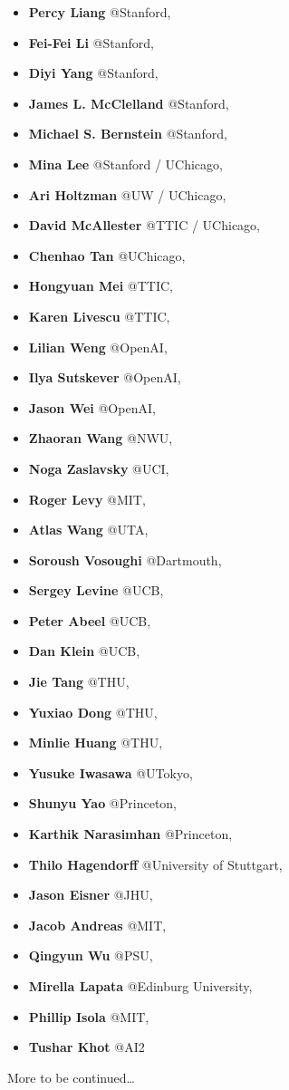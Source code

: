 \documentclass[10pt]{article} %
\begin{document}
\begin{itemize}
\item \textbf{Percy Liang} @Stanford,
\item \textbf{Fei-Fei Li} @Stanford,
\item \textbf{Diyi Yang} @Stanford, 
\item \textbf{James L. McClelland} @Stanford,
\item \textbf{Michael S. Bernstein} @Stanford,
\item \textbf{Mina Lee} @Stanford / UChicago,
\item \textbf{Ari Holtzman} @UW / UChicago,
\item \textbf{David McAllester} @TTIC / UChicago,
\item \textbf{Chenhao Tan} @UChicago,
\item \textbf{Hongyuan Mei} @TTIC,
\item \textbf{Karen Livescu} @TTIC,
\item \textbf{Lilian Weng} @OpenAI,
\item \textbf{Ilya Sutskever} @OpenAI,
\item \textbf{Jason Wei} @OpenAI,
\item \textbf{Zhaoran Wang} @NWU,
\item \textbf{Noga Zaslavsky} @UCI,
\item \textbf{Roger Levy} @MIT,
\item \textbf{Atlas Wang} @UTA,
\item \textbf{Soroush Vosoughi} @Dartmouth,
\item \textbf{Sergey Levine} @UCB,
\item \textbf{Peter Abeel} @UCB,
\item \textbf{Dan Klein} @UCB,
\item \textbf{Jie Tang} @THU,
\item \textbf{Yuxiao Dong} @THU,
\item \textbf{Minlie Huang} @THU,
\item \textbf{Yusuke Iwasawa} @UTokyo, 
\item \textbf{Shunyu Yao} @Princeton,
\item \textbf{Karthik Narasimhan} @Princeton,
\item \textbf{Thilo Hagendorff} @University of Stuttgart,
\item \textbf{Jason Eisner} @JHU,
\item \textbf{Jacob Andreas} @MIT,
\item \textbf{Qingyun Wu} @PSU,
\item \textbf{Mirella Lapata} @Edinburg University,
\item \textbf{Phillip Isola} @MIT,
\item \textbf{Tushar Khot} @AI2
\end{itemize}


More to be continued…


% 
% 

\end{document}

